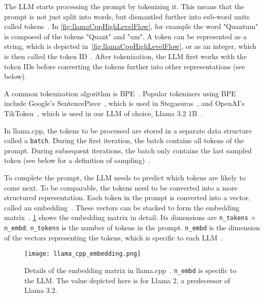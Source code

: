 The \gls{LLM} starts processing the prompt by tokenizing it. This means that the prompt is not just split into words, but dismantled further into sub-word units called tokens~\cite{mallisUnderstandingHowLLM2023}. In \cref{fig:llamaCppHighLevelFlow}, for example the word "Quantum" is composed of the tokens "Quant" and "um". A token can be represented as a string, which is depicted in~\cref{fig:llamaCppHighLevelFlow}, or as an integer, which is then called the token ID~\cite{mallisUnderstandingHowLLM2023}. After tokenization, the \gls{LLM} first works with the token IDs before converting the tokens further into other representations (see below).

A common tokenization algorithm is \gls{BPE}~\cite{sennrichNeuralMachineTranslation2016}. Popular tokenizers using \gls{BPE} include Google's SentencePiece~\cite{googleGoogleSentencepiece2024}, which is used in Stegasuras~\cite{zieglerHarvardnlpNeuralSteganography2025,zieglerStegasuras2025}, and OpenAI's TikToken~\cite{openaiOpenaiTiktoken2025}, which is used in our \gls{LLM} of choice, Llama 3.2 1B~\cite{metaMetallamaLlamamodels2025}.

In llama.cpp, the tokens to be processed are stored in a separate data structure called a \lstinline|batch|. During the first iteration, the batch contains all tokens of the prompt. During subsequent iterations, the batch only contains the last sampled token (see below for a definition of sampling)~\cite{gerganovGgerganovLlamacpp2024}.

To complete the prompt, the \gls{LLM} needs to predict which tokens are likely to come next. To be comparable, the tokens need to be converted into a more structured representation. Each token in the prompt is converted into a vector, called an embedding~\cite{mallisUnderstandingHowLLM2023}. These vectors can be stacked to form the embedding matrix~\cite{mallisUnderstandingHowLLM2023}. \cref{fig:llamaCppEmbedding} shows the embedding matrix in detail. Its dimensions are \lstinline|n_tokens| $\times$ \lstinline|n_embd|. \lstinline|n_tokens| is the number of tokens in the prompt. \lstinline|n_embd| is the dimension of the vectors representing the tokens, which is specific to each \gls{LLM}~\cite{mallisUnderstandingHowLLM2023}.

\begin{figure}
    \begin{wide}
        \centering
        \captionsetup{width=\linewidth}
        \texttt{[image: llama\_cpp\_embedding.png]}
        \caption[llama.cpp: Embedding matrix]{Details of the embedding matrix in llama.cpp~\cite{mallisUnderstandingHowLLM2023}. \lstinline|n_embd| is specific to the \gls{LLM}. The value depicted here is for Llama 2, a predecessor of Llama 3.2.}
        \label{fig:llamaCppEmbedding}
    \end{wide}
\end{figure}

